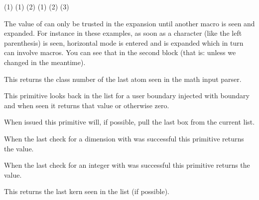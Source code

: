 \def\MyMacro    #1{(#1)           \the\lastarguments} \MyMacro{1}       \crlf
\def\MyMacro  #1#2{(#1) (#2)      \the\lastarguments} \MyMacro{1}{2}    \crlf
\def\MyMacro#1#2#3{(#1) (#2) (#3) \the\lastarguments} \MyMacro{1}{2}{3} \par
\stopbuffer

\typebuffer

The value of  can only be trusted in the expansion until
another macro is seen and expanded. For instance in these examples, as soon as a
character (like the left parenthesis) is seen, horizontal mode is entered and
 is expanded which in turn can involve macros. You can see that
in the second block (that is: unless we changed  in the
meantime).

{\getbuffer}

\stopnewprimitive

\startnewprimitive[title={\prm {lastatomclass}}]

This returns the class number of the last atom seen in the math input parser.

\stopnewprimitive

\startnewprimitive[title={\prm {lastboundary}}]

This primitive looks back in the list for a user boundary injected with \prm
{boundary} and when seen it returns that value or otherwise zero.

\stopnewprimitive

\startoldprimitive[title={\prm {lastbox}}]

When issued this primitive will, if possible, pull the last box from the current
list.

\stopoldprimitive

\startnewprimitive[title={\prm {lastchkdimension}}]

When the last check for a dimension with  was successful
this primitive returns the value.

\stopnewprimitive

\startnewprimitive[title={\prm {lastchknumber}}]

When the last check for an integer with  was successful this
primitive returns the value.

\stopnewprimitive

\startoldprimitive[title={\prm {lastkern}}]

This returns the last kern seen in the list (if possible).

\stopoldprimitive

